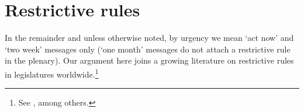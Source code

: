 \documentclass[letter,12pt]{article}
\begin{document}

\section{Restrictive rules}

In the remainder and unless otherwise noted, by urgency we mean `act now' and `two week' messages only (`one month' messages do not attach a restrictive rule in the plenary). Our argument here joins a growing literature on restrictive rules in legislatures worldwide.\footnote{See \citet{dion.huber.1996,doring.restrictiveRules.2003,huber.1996a,krehbielRestrictiveRules1997,heller.2001,weingast.1992,schickler.richRules1997,cox.mccubbins.1997,amorim.cox.mccubbins.2003,calvo.2014argBook,sin.2014,denhartog.2004phd}, among others.} 
\end{document}
